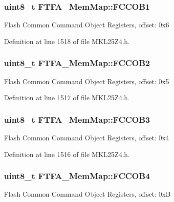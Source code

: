\subsubsection[{\texorpdfstring{F\+C\+C\+O\+B1}{FCCOB1}}]{\setlength{\rightskip}{0pt plus 5cm}uint8\+\_\+t F\+T\+F\+A\+\_\+\+Mem\+Map\+::\+F\+C\+C\+O\+B1}\hypertarget{struct_f_t_f_a___mem_map_a735b6bacdf0355f01b021572da2dc49c}{}\label{struct_f_t_f_a___mem_map_a735b6bacdf0355f01b021572da2dc49c}
Flash Common Command Object Registers, offset\+: 0x6 

Definition at line 1518 of file M\+K\+L25\+Z4.\+h.

\subsubsection[{\texorpdfstring{F\+C\+C\+O\+B2}{FCCOB2}}]{\setlength{\rightskip}{0pt plus 5cm}uint8\+\_\+t F\+T\+F\+A\+\_\+\+Mem\+Map\+::\+F\+C\+C\+O\+B2}\hypertarget{struct_f_t_f_a___mem_map_a84bdc42ccb0012ffd76bc7878acb10e4}{}\label{struct_f_t_f_a___mem_map_a84bdc42ccb0012ffd76bc7878acb10e4}
Flash Common Command Object Registers, offset\+: 0x5 

Definition at line 1517 of file M\+K\+L25\+Z4.\+h.

\subsubsection[{\texorpdfstring{F\+C\+C\+O\+B3}{FCCOB3}}]{\setlength{\rightskip}{0pt plus 5cm}uint8\+\_\+t F\+T\+F\+A\+\_\+\+Mem\+Map\+::\+F\+C\+C\+O\+B3}\hypertarget{struct_f_t_f_a___mem_map_a2a9a7e1603f232e71dfc40c418b6518e}{}\label{struct_f_t_f_a___mem_map_a2a9a7e1603f232e71dfc40c418b6518e}
Flash Common Command Object Registers, offset\+: 0x4 

Definition at line 1516 of file M\+K\+L25\+Z4.\+h.

\subsubsection[{\texorpdfstring{F\+C\+C\+O\+B4}{FCCOB4}}]{\setlength{\rightskip}{0pt plus 5cm}uint8\+\_\+t F\+T\+F\+A\+\_\+\+Mem\+Map\+::\+F\+C\+C\+O\+B4}\hypertarget{struct_f_t_f_a___mem_map_acfc0ac633b156ae48b3e3fdeaafde51b}{}\label{struct_f_t_f_a___mem_map_acfc0ac633b156ae48b3e3fdeaafde51b}
Flash Common Command Object Registers, offset\+: 0xB 

